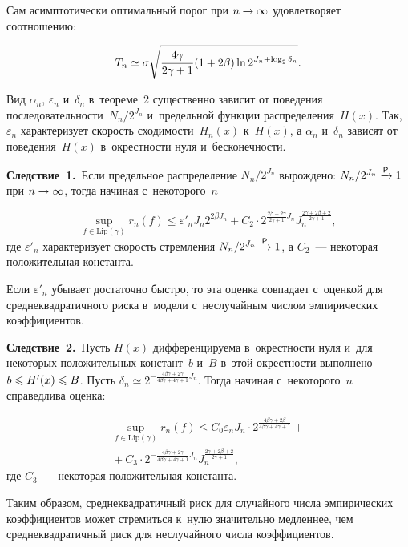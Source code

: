 \begin{multicols}{2}
Сам асимптотически оптимальный порог при $n\hm\to\infty$ удовлетворяет соотношению:

\noindent
$$
T_n\simeq\sigma\sqrt{\displaystyle\frac{\displaystyle 4\gamma\mathstrut}{\displaystyle 2\gamma+1\mathstrut}(1+2\beta)\ln 2^{J_n+\log_2\delta_n}}.
$$


Вид $\alpha_n$, $\varepsilon_n$ и~$\delta_n$ в~теореме~2 
существенно зависит от поведения последовательности~$N_n/2^{J_n}$ 
и~предельной функции распределения~$H(x)$. Так, $\varepsilon_n$ 
характеризует скорость сходимости~$H_n(x)$ к~$H(x)$, а $\alpha_n$ и~$\delta_n$ 
зависят от поведения~$H(x)$ в~окрестности нуля и~бесконечности.

\smallskip

\noindent
\textbf{Следствие~1.}\
 Если предельное распределение $N_n/2^{J_n}$ вырождено: 
 $N_n/2^{J_n}\xrightarrow{{\sf P}}1$ при $n\hm\to\infty$, тогда начиная 
 с~некоторого~$n$
 
 \noindent
\begin{equation*}
\sup\limits_{f\in \mathrm{Lip}(\gamma)}{r_n(f)}
\leqslant \varepsilon'_n J_n 2^{2\beta J_n}+C_2 \cdot
2^{\frac{2\beta-2\gamma}{2\gamma+1}J_n}
J_n^{\frac{2\gamma+2\beta+2}{2\gamma+1}},
\end{equation*}
где $\varepsilon'_n$ характеризует скорость стремления 
$N_n/2^{J_n}\xrightarrow{{\sf P}}1$, а $C_2$~--- некоторая положительная константа.

Если $\varepsilon'_n$ убывает достаточно быстро, 
то эта оценка совпадает с~оценкой для среднеквадратичного 
риска в~модели с~неслучайным числом эмпирических коэффициентов.

\smallskip

\noindent
\textbf{Следствие~2.}\ 
Пусть $H(x)$ дифференцируема в~окрестности нуля и~для некоторых 
положительных констант~$b$ и~$B$ в~этой окрестности выполнено 
$b\hm\leqslant H'(x)\hm\leqslant B$. Пусть
$\delta_n\simeq 2^{-\frac{4\beta\gamma+2\gamma}{4\beta\gamma+4\gamma+1}J_n}$. 
Тогда начиная с~некоторого~$n$ справедлива оценка:

\noindent
\begin{multline*}
\sup\limits_{f\in \mathrm{Lip}(\gamma)}
{r_n(f)}\leqslant C_0\varepsilon_n J_n\cdot
2^{\frac{4\beta\gamma+2\beta}{4\beta\gamma+4\gamma+1}}+{}\\
{}+
C_3 \cdot
2^{-\frac{4\beta\gamma+2\gamma}{4\beta\gamma+4\gamma+1}J_n}
J_n^{\frac{2\gamma+2\beta+2}{2\gamma+1}},
\end{multline*}
где $C_3$~--- некоторая положительная константа.

Таким образом, среднеквадратичный риск для случайного числа эмпирических 
коэффициентов может стремиться к~нулю значительно медленнее, 
чем среднеквадратичный риск для неслучайного числа коэффициентов.


\end{multicols}
